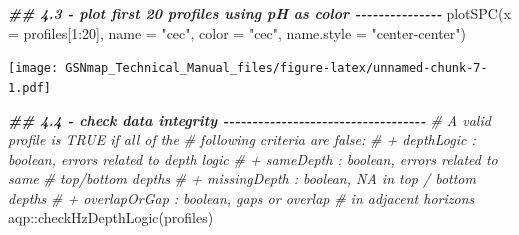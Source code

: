 \documentclass[
  10pt,
  b5paper,
  oneside]{book}
\newenvironment{Shaded}{\begin{snugshade}}{\end{snugshade}}
\newcommand{\AttributeTok}[1]{\textcolor[rgb]{0.77,0.63,0.00}{#1}}
\newcommand{\CommentTok}[1]{\textcolor[rgb]{0.56,0.35,0.01}{\textit{#1}}}
\newcommand{\DecValTok}[1]{\textcolor[rgb]{0.00,0.00,0.81}{#1}}
\newcommand{\DocumentationTok}[1]{\textcolor[rgb]{0.56,0.35,0.01}{\textbf{\textit{#1}}}}
\newcommand{\FunctionTok}[1]{\textcolor[rgb]{0.00,0.00,0.00}{#1}}
\newcommand{\NormalTok}[1]{#1}
\newcommand{\SpecialCharTok}[1]{\textcolor[rgb]{0.00,0.00,0.00}{#1}}
\newcommand{\StringTok}[1]{\textcolor[rgb]{0.31,0.60,0.02}{#1}}
\begin{document}
\begin{Shaded}
\begin{Highlighting}[]
\DocumentationTok{\#\# 4.3 {-} plot first 20 profiles using pH as color {-}{-}{-}{-}{-}{-}{-}{-}{-}{-}{-}{-}{-}{-}{-}}
\FunctionTok{plotSPC}\NormalTok{(}\AttributeTok{x =}\NormalTok{ profiles[}\DecValTok{1}\SpecialCharTok{:}\DecValTok{20}\NormalTok{], }\AttributeTok{name =} \StringTok{"cec"}\NormalTok{, }\AttributeTok{color =} \StringTok{"cec"}\NormalTok{,}
        \AttributeTok{name.style =} \StringTok{"center{-}center"}\NormalTok{)}
\end{Highlighting}
\end{Shaded}

\texttt{[image: GSNmap\_Technical\_Manual\_files/figure-latex/unnamed-chunk-7-1.pdf]}

\begin{Shaded}
\begin{Highlighting}[]
\DocumentationTok{\#\# 4.4 {-} check data integrity {-}{-}{-}{-}{-}{-}{-}{-}{-}{-}{-}{-}{-}{-}{-}{-}{-}{-}{-}{-}{-}{-}{-}{-}{-}{-}{-}{-}{-}{-}{-}{-}{-}{-}{-}}
\CommentTok{\# A valid profile is TRUE if all of the }
\CommentTok{\# following criteria are false:}
\CommentTok{\#    + depthLogic : boolean, errors related to depth logic}
\CommentTok{\#    + sameDepth : boolean, errors related to same }
\CommentTok{\#    top/bottom depths}
\CommentTok{\#    + missingDepth : boolean, NA in top / bottom depths}
\CommentTok{\#    + overlapOrGap : boolean, gaps or overlap }
\CommentTok{\#    in adjacent horizons}
\NormalTok{aqp}\SpecialCharTok{::}\FunctionTok{checkHzDepthLogic}\NormalTok{(profiles)}
\end{Highlighting}
\end{Shaded}
\end{document}
